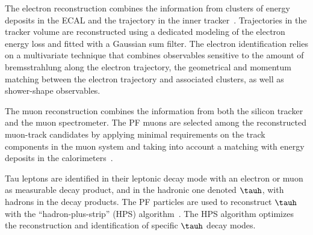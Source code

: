 The electron reconstruction combines the information from clusters of energy
deposits in the ECAL and the trajectory in the inner
tracker~\cite{Baffioni:2006cd,CMS-PAS-EGM-10-004}.  
Trajectories
in the tracker volume are reconstructed using a dedicated modeling of
the electron energy loss and fitted with a Gaussian sum filter.
The electron identification relies on a
multivariate technique that combines observables sensitive to the
amount of bremsstrahlung along the electron trajectory, the
geometrical and momentum matching between the electron trajectory and
associated clusters, as well as shower-shape observables.

%
The muon reconstruction combines the information from both the silicon
tracker and the muon spectrometer.  
The PF muons are selected among the reconstructed
muon-track candidates by applying minimal requirements on the track
components in the muon system and taking into account a matching with
energy deposits in the calorimeters~\cite{CMS-PAS-PFT-10-003}.

Tau leptons are identified in their leptonic decay mode 
with an electron or muon as measurable decay product, and in
the hadronic one denoted $\tauh$, with hadrons in the decay products.
The PF particles are used to reconstruct $\tauh$ with the
``hadron-plus-strip'' (HPS) algorithm~\cite{Chatrchyan:2011xq}.  The
HPS algorithm optimizes the reconstruction and identification of
specific $\tauh$ decay modes.  


